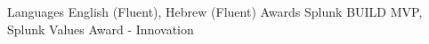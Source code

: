 

\begin{cvskills}

  \cvskill
    {Languages} %
    {English (Fluent), Hebrew (Fluent)} %
  \cvskill
    {Awards} %
    {Splunk BUILD MVP, Splunk Values Award - Innovation} %

\end{cvskills}